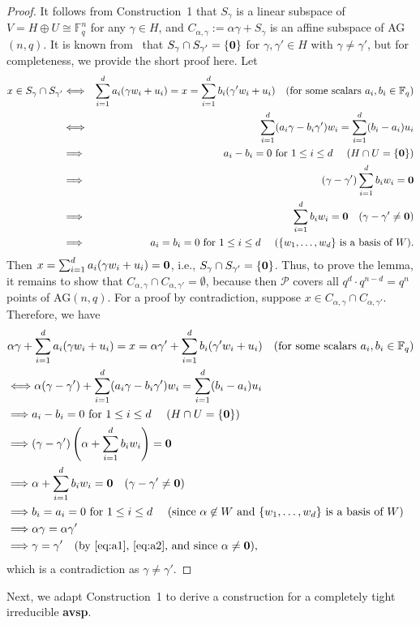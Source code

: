 \documentclass[11pt]{amsart}
\def \bs{\bigskip}
\def \P{{\mathcal P}}
\def \ga{\gamma}
\def \al{\alpha}
\def \bea{\begin{eqnarray*}}
\def \eea{\end{eqnarray*}}
\def \F{{\mathbb F}}
\def \avsp{\mbox{\bf avsp}}
\def \o{\mbox{\bf 0} }
\begin{document}
\begin{proof}
It follows from Construction~1 that $S_\ga$ is a linear subspace of $V=H\oplus U\cong \F_q^{n}$ for any $\ga\in H$, and $C_{\al,\ga}:=\al\ga+S_\ga$ is an affine subspace of AG$(n,q)$. It is known from~\cite[Theorem~3.1]{ESSSV} that $S_\ga\cap S_{\ga'}=\{\o\}$  for $\ga,\ga'\in H$ with $\ga\not=\ga'$, but for completeness, we provide the short proof here.  Let
%
\bea
x\in S_\ga\cap S_{\ga'}
&\Longleftrightarrow& \sum_{i=1}^d a_i(\ga w_i+u_i)=x=\sum_{i=1}^d b_i (\ga' w_i+u_i) \quad \mbox{(for some scalars $a_i,b_i\in \F_q$)}\cr
&\Longleftrightarrow& \sum_{i=1}^d (a_i\ga-b_i\ga')w_i=\sum_{i=1}^d (b_i-a_i)u_i\cr
&\Longrightarrow& a_i-b_i=0 \mbox{ for $1\leq i\leq d$ } 
\quad  (H \cap U=\{\o\})\cr
&\Longrightarrow& (\ga-\ga')\sum_{i=1}^d b_i w_i=\o\cr
&\Longrightarrow& \sum_{i=1}^d b_i w_i=\o \quad (\ga-\ga'\not=\o)\cr
&\Longrightarrow&  a_i=b_i=0 \mbox{ for $1\leq i\leq d$ } \quad \mbox{($\{w_1,\ldots ,w_d\}$ is a basis of  $W$)}.\cr
\eea
Then  $x=\sum_{i=1}^d a_i(\ga w_i+u_i)=\o$, i.e., $S_\ga\cap S_{\ga'}=\{\o\}$. Thus, to prove the lemma, it remains to show that 
$C_{\al,\ga}\cap C_{\al,\ga'}=\emptyset$, because then $\P$ covers all $q^d\cdot q^{n-d}=q^n$ points of AG$(n,q)$. For a proof by contradiction, suppose $x\in C_{\al,\ga}\cap C_{\al,\ga'}$. Therefore, we  have
%
\begin{align}
&\al\ga+\sum_{i=1}^d a_i(\ga w_i+u_i)=
x=\al\ga'+\sum_{i=1}^d b_i (\ga' w_i+u_i) \quad \mbox{(for some scalars $a_i,b_i\in \F_q$)}\cr
&\Longleftrightarrow \al(\ga-\ga')+ \sum_{i=1}^d (a_i\ga-b_i\ga')w_i=\sum_{i=1}^d (b_i-a_i)u_i\label{eq:a1}\\
&\Longrightarrow a_i-b_i=0 \mbox{ for $1\leq i\leq d$ } \quad (H \cap U=\{\o\})\cr 
&\Longrightarrow (\ga-\ga')\left(\al+ \sum_{i=1}^d b_iw_i\right)=\o \cr
&\Longrightarrow \al+ \sum_{i=1}^d b_iw_i=\o \quad (\ga-\ga'\not=\o)\cr
&\Longrightarrow  b_i=a_i=0 \mbox{ for $1\leq i\leq d$ } \quad \mbox{(since $\al\not\in W$ and $\{w_1,\ldots ,w_d\}$ is a basis of  $W$)}\label{eq:a2}\\
&\Longrightarrow  \al\ga=\al\ga' \cr
&\Longrightarrow  \ga=\ga' \quad \mbox{(by~\eqref{eq:a1},~\eqref{eq:a2},  and since $\al\not=\o$)},\notag
\end{align}
which is a contradiction as $\ga\not=\ga'$. 
\end{proof}
%

\bs Next, we adapt Construction~1 to derive a construction for a completely tight irreducible \avsp.
\end{document}
